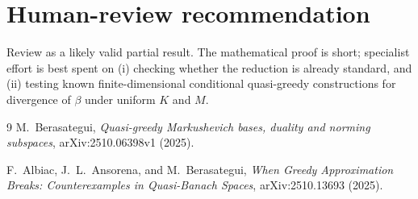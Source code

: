 \documentclass[11pt]{article}
\begin{document}
\section{Human-review recommendation}

Review as a likely valid partial result.  The mathematical proof is short;
specialist effort is best spent on (i) checking whether the reduction is
already standard, and (ii) testing known finite-dimensional conditional
quasi-greedy constructions for divergence of $\beta$ under uniform $K$ and
$M$.

\begin{thebibliography}{9}
M.~Berasategui,
\emph{Quasi-greedy Markushevich bases, duality and norming subspaces},
arXiv:2510.06398v1 (2025).

F.~Albiac, J.~L.~Ansorena, and M.~Berasategui,
\emph{When Greedy Approximation Breaks: Counterexamples in Quasi-Banach
Spaces}, arXiv:2510.13693 (2025).
\end{thebibliography}
\end{document}
